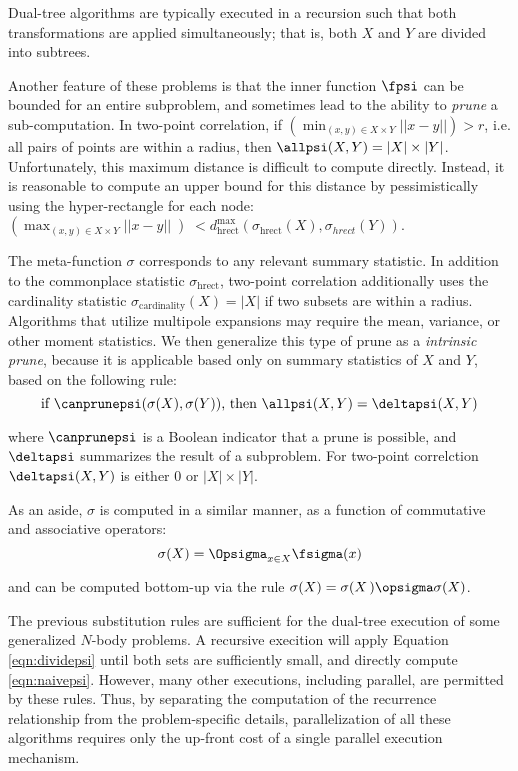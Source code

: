 \documentclass[times, 10pt,twocolumn]{article}
\DeclareMathOperator{\cardinality}{cardinality}
\DeclareMathOperator{\hrect}{hrect}
\begin{document}
Dual-tree algorithms are typically executed in a recursion such that both transformations are applied simultaneously; that is, both $X$ and $Y$ are divided into subtrees.

Another feature of these problems is that the inner function $\fpsi$ can be bounded for an entire subproblem, and sometimes lead to the ability to {\it prune} a sub-computation.
In two-point correlation, if $\left(\min_{(x, y) \in X \times Y} ||x - y||\right) > r$, i.e. all pairs of points are within a radius, then $\allpsi(X, Y) = |X| \times |Y|$.
Unfortunately, this maximum distance is difficult to compute directly.
Instead, it is reasonable to compute an upper bound for this distance by pessimistically using the hyper-rectangle for each node: $\left(\max_{(x, y) \in X \times Y} ||x - y||\left) < d^\max_\hrect(\sigma_{\hrect}(X), \sigma_{hrect}(Y))$.

The meta-function $\sigma$ corresponds to any relevant summary statistic.
In addition to the commonplace statistic $\sigma_{\hrect}$, two-point correlation additionally uses the cardinality statistic $\sigma_{\cardinality}(X) = |X|$ if two subsets are within a radius.
Algorithms that utilize multipole expansions may require the mean, variance, or other moment statistics.
We then generalize this type of prune as a {\it intrinsic prune}, because it is applicable based only on summary statistics of $X$ and $Y$, based on the following rule:
\begin{equation}
\mbox{if } \canprunepsi(\sigma(X), \sigma(Y)) \mbox{, then } \allpsi(X, Y) = \deltapsi(X, Y)
\label{eqn:intrinsic}
\end{equation}

\noindent where $\canprunepsi$ is a Boolean indicator that a prune is possible, and $\deltapsi$ summarizes the result of a subproblem.
For two-point correlction $\deltapsi(X, Y)$ is either $0$ or $|X| \times |Y|$.

As an aside, $\sigma$ is computed in a similar manner, as a function of commutative and associative operators:
\begin{equation}
\sigma(X) = \Opsigma_{x \in X} \fsigma(x)
\label{eqn:defsigma}
\end{equation}

\noindent and can be computed bottom-up via the rule $\sigma(X) = \sigma(X\left) \opsigma \sigma(X\right)$.

\noindent The previous substitution rules are sufficient for the dual-tree execution of some generalized $N$-body problems.
A recursive execition will apply Equation \ref{eqn:dividepsi} until both sets are sufficiently small, and directly compute \ref{eqn:naivepsi}.
However, many other executions, including parallel, are permitted by these rules.
Thus, by separating the computation of the recurrence relationship from the problem-specific details, parallelization of all these algorithms requires only the up-front cost of a single parallel execution mechanism.
\end{document}
